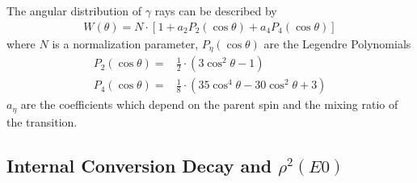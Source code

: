 \documentclass[twocolumn,preprintnumbers,amsmath,amssymb]{revtex4}
\begin{document}
The angular distribution of $\gamma$ rays can be described by \cite{evitts_83}
\begin{gather}
W(\theta) = N\cdot[1+a_2P_2(\cos \theta) + a_4P_4(\cos \theta)]
\label{angularDistro}
\end{gather} 
where $N$ is a normalization parameter, $P_\eta(\cos \theta)$ are the Legendre Polynomials
\begin{equation}
\begin{aligned}
P_2(\cos \theta) ={}& \frac{1}{2}\cdot (3 \cos^2 \theta - 1) \\
P_4(\cos \theta) ={}& \frac{1}{8}\cdot (35 \cos^4 \theta - 30 \cos^2 \theta + 3)
\label{legendre}
\end{aligned}
\end{equation}
$a_\eta$ are the coefficients which depend on the parent spin and the mixing ratio of the transition. 



\subsection{Internal Conversion Decay and $\rho^2(E0)$}
\end{document}
